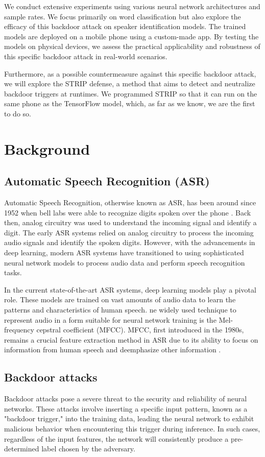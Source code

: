 \documentclass{report}
\theoremstyle{definition}
\theoremstyle{remark}
\begin{document}
We conduct extensive experiments using various neural network architectures and sample rates. We focus primarily on word classification but also explore the efficacy of this backdoor attack on speaker identification models. The trained models are deployed on a mobile phone using a custom-made app. By testing the models on physical devices, we assess the practical applicability and robustness of this specific backdoor attack in real-world scenarios.

Furthermore, as a possible countermeasure against this specific backdoor attack, we will explore the STRIP defense, a method that aims to detect and neutralize backdoor triggers at runtimes. We programmed STRIP so that it can run on the same phone as the TensorFlow model, which, as far as we know, we are the first to do so.

\chapter{Background}
\section{Automatic Speech Recognition (ASR)}
Automatic Speech Recognition, otherwise known as ASR, has been around since 1952 when bell labs were able to recognize digits spoken over the phone \cite{ASRHistory}. Back then, analog circuitry was used to understand the incoming signal and identify a digit. The early ASR systems relied on analog circuitry to process the incoming audio signals and identify the spoken digits. However, with the advancements in deep learning, modern ASR systems have transitioned to using sophisticated neural network models to process audio data and perform speech recognition tasks.

In the current state-of-the-art ASR systems, deep learning models play a pivotal role. These models are trained on vast amounts of audio data to learn the patterns and characteristics of human speech. ne widely used technique to represent audio in a form suitable for neural network training is the Mel-frequency cepstral coefficient (MFCC). MFCC, first introduced in the 1980s, remains a crucial feature extraction method in ASR due to its ability to focus on information from human speech and deemphasize other information \cite{dave2013feature}.


\section{Backdoor attacks}
Backdoor attacks pose a severe threat to the security and reliability of neural networks. These attacks involve inserting a specific input pattern, known as a "backdoor trigger," into the training data, leading the neural network to exhibit malicious behavior when encountering this trigger during inference. In such cases, regardless of the input features, the network will consistently produce a pre-determined label chosen by the adversary.
\end{document}
